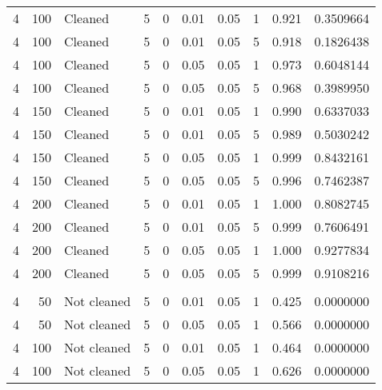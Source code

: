 \begin{table}
{{\begin{tabular}{rrlrrrrrrr}
\hspace{1em}4 & 100 & Cleaned & 5 & 0 & 0.01 & 0.05 & 1 & 0.921 & 0.3509664\\
\hspace{1em}4 & 100 & Cleaned & 5 & 0 & 0.01 & 0.05 & 5 & 0.918 & 0.1826438\\
\hspace{1em}4 & 100 & Cleaned & 5 & 0 & 0.05 & 0.05 & 1 & 0.973 & 0.6048144\\
\hspace{1em}4 & 100 & Cleaned & 5 & 0 & 0.05 & 0.05 & 5 & 0.968 & 0.3989950\\
\hspace{1em}4 & 150 & Cleaned & 5 & 0 & 0.01 & 0.05 & 1 & 0.990 & 0.6337033\\
\hspace{1em}4 & 150 & Cleaned & 5 & 0 & 0.01 & 0.05 & 5 & 0.989 & 0.5030242\\
\hspace{1em}4 & 150 & Cleaned & 5 & 0 & 0.05 & 0.05 & 1 & 0.999 & 0.8432161\\
\hspace{1em}4 & 150 & Cleaned & 5 & 0 & 0.05 & 0.05 & 5 & 0.996 & 0.7462387\\
\hspace{1em}4 & 200 & Cleaned & 5 & 0 & 0.01 & 0.05 & 1 & 1.000 & 0.8082745\\
\hspace{1em}4 & 200 & Cleaned & 5 & 0 & 0.01 & 0.05 & 5 & 0.999 & 0.7606491\\
\hspace{1em}4 & 200 & Cleaned & 5 & 0 & 0.05 & 0.05 & 1 & 1.000 & 0.9277834\\
\hspace{1em}4 & 200 & Cleaned & 5 & 0 & 0.05 & 0.05 & 5 & 0.999 & 0.9108216\\
\addlinespace[0.3em]
\multicolumn{10}{l}{\textbf{$t_3$ Distribution}}\\
\hspace{1em}4 & 50 & Not cleaned & 5 & 0 & 0.01 & 0.05 & 1 & 0.425 & 0.0000000\\
\hspace{1em}4 & 50 & Not cleaned & 5 & 0 & 0.05 & 0.05 & 1 & 0.566 & 0.0000000\\
\hspace{1em}4 & 100 & Not cleaned & 5 & 0 & 0.01 & 0.05 & 1 & 0.464 & 0.0000000\\
\hspace{1em}4 & 100 & Not cleaned & 5 & 0 & 0.05 & 0.05 & 1 & 0.626 & 0.0000000\\

\end{tabular}}}
\end{table}
